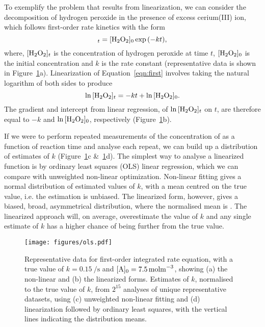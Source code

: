 \documentclass[journal=jceda8,manuscript=article]{achemso}
\begin{document}
To exemplify the problem that results from linearization, we can consider the decomposition of hydrogen peroxide  in the presence of excess cerium(III) ion, which follows first-order rate kinetics with the form~\cite{monk_math_2010}
%
\begin{equation}
    [\ce{H2O2}]_t = [\ce{H2O2}]_0\exp{(-kt)},
    \label{eqn:first}
\end{equation}
%
where, $[\ce{H2O2}]_t$ is the concentration of hydrogen peroxide at time $t$, $[\ce{H2O2}]_0$ is the initial concentration and $k$ is the rate constant (representative data is shown in Figure~\ref{fig:ols}a).
Linearization of Equation~\ref{eqn:first} involves taking the natural logarithm of both sides to produce
%
\begin{equation}
    \ln{[\ce{H2O2}]_t} = -kt + \ln{[\ce{H2O2}]_0}.
    \label{eqn:log}
\end{equation}
%
The gradient and intercept from linear regression, of $\ln{[\ce{H2O2}]_t}$ on $t$, are therefore equal to $-k$ and $\ln{[\ce{H2O2}]_0}$, respectively (Figure~\ref{fig:ols}b).

If we were to perform repeated measurements of the concentration of  as a function of reaction time and analyse each repeat, we can build up a distribution of estimates of $k$ (Figure~\ref{fig:ols}c \&~\ref{fig:ols}d). 
The simplest way to analyse a linearized function is by ordinary least squares (OLS) linear regression, which we can compare with unweighted non-linear optimization. 
Non-linear fitting gives a normal distribution of estimated values of $k$, with a mean centred on the true value, i.e. the estimation is unbiased. 
The linearized form, however, gives a biased, broad, asymmetrical distribution, where the normalised mean is .
The linearized approach will, on average, overestimate the value of $k$ and any single estimate of $k$ has a higher chance of being further from the true value. 
%
\begin{figure}
  \texttt{[image: figures/ols.pdf]}
  \caption{
    Representative data for first-order integrated rate equation, with a true value of $k=\SI{0.15}{\per\second}$ and $[\ce{A}]_0=\SI{7.5}{\mol\m^{-3}}$, showing (a) the non-linear and (b) the linearized forms. 
    Estimates of $k$, normalised to the true value of $k$, from $2^{15}$ analyses of unique representative datasets, using (c) unweighted non-linear fitting and (d) linearization followed by ordinary least squares, with the vertical lines indicating the distribution means.
    }
  \label{fig:ols}
\end{figure}
%
\end{document}
